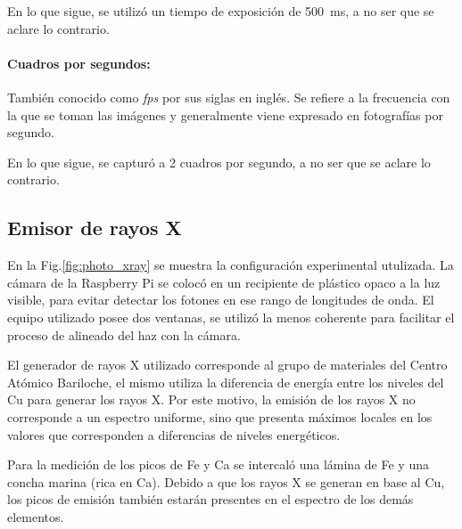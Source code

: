 \documentclass[twoside,twocolumn]{article}
\begin{document}
        En lo que sigue, se utilizó un tiempo de exposición de \SI{500}{\milli\second}, a no ser que se aclare lo contrario.

      \paragraph{Cuadros por segundos:}
        También conocido como \emph{fps} por sus siglas en inglés.
        Se refiere a la frecuencia con la que se toman las imágenes y generalmente viene expresado en fotografías por segundo.
        
        En lo que sigue, se capturó a 2 cuadros por segundo, a no ser que se aclare lo contrario.


    \subsection{Emisor de rayos X}\label{sec:conf_exp:x-rays}
      En la Fig.\ref{fig:photo_xray} se muestra la configuración experimental utulizada.
      La cámara de la Raspberry Pi se colocó en un recipiente de plástico opaco a la luz visible,
      para evitar detectar los fotones en ese rango de longitudes de onda.
      El equipo utilizado posee dos ventanas, se utilizó la menos coherente para facilitar el proceso
      de alineado del haz con la cámara. 

      El generador de rayos X utilizado corresponde al grupo de materiales del Centro Atómico Bariloche,
      el mismo utiliza la diferencia de energía entre los niveles del Cu para generar los rayos X.
      Por este motivo, la emisión de los rayos X no corresponde a un espectro uniforme, sino que presenta
      máximos locales en los valores que corresponden a diferencias de niveles energéticos.
      
      Para la medición de los picos de Fe y Ca se intercaló una lámina de Fe y una concha marina (rica en Ca).
      Debido a que los rayos X se generan en base al Cu, los picos de emisión también estarán presentes en
      el espectro de los demás elementos.
\end{document}
